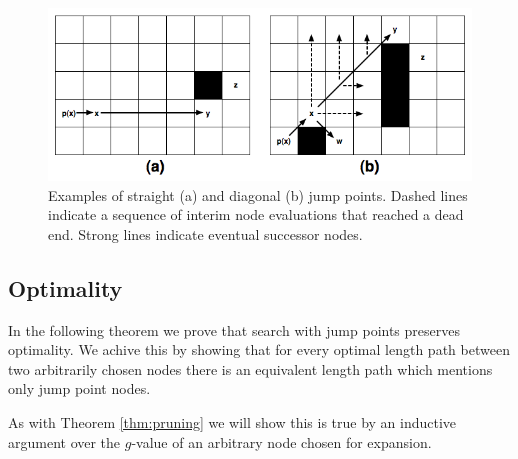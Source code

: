 \begin{figure}[tb]
       \begin{center}
		   \includegraphics[scale=0.35, trim = 10mm 10mm 10mm 0mm]
			{diagrams/jumppoints.png}
       \end{center}
	\vspace{-3pt}
       \caption{Examples of straight (a) and diagonal (b) jump points.
Dashed lines indicate a sequence of interim node evaluations that reached
a dead end. Strong lines indicate eventual successor nodes.}
       \label{fig:jumppoints}
\end{figure}

\subsection{Optimality}
In the following theorem we prove that search with jump points preserves
optimality. We achive this by showing that for every optimal length path between 
two arbitrarily chosen nodes there is an equivalent length path which mentions
only jump point nodes. 

As with Theorem \ref{thm:pruning} we will show this is true
by an inductive argument over the $g$-value of an arbitrary node chosen
for expansion.

%
%
%
%

